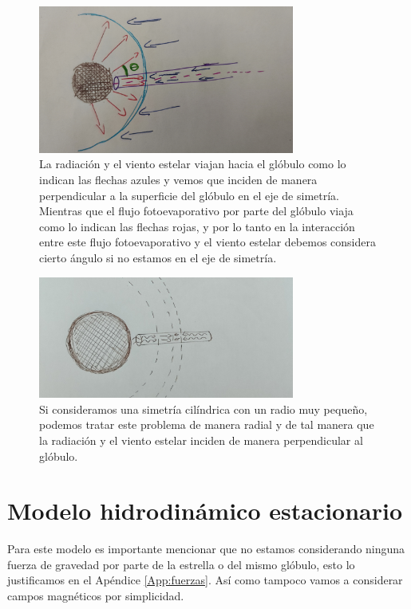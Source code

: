\documentclass{book}
\begin{document}
\begin{figure}[h]
    \centering    \includegraphics[width=0.75\textwidth]{images Chapter 2/C2_angles.jpg}
    \caption{La radiación y el viento estelar viajan hacia el glóbulo como lo indican las flechas azules y vemos que inciden de manera perpendicular a la superficie del glóbulo en el eje de simetría. Mientras que el flujo fotoevaporativo por parte del glóbulo viaja como lo indican las flechas rojas, y por lo tanto en la interacción entre este flujo fotoevaporativo y el viento estelar debemos considera cierto ángulo si no estamos en el eje de simetría.}
    \label{fig:cilindross}
\end{figure}

\begin{figure}[h]
    \centering    \includegraphics[width=0.75\textwidth]{images Chapter 2/Chp2_cilinders.jpg}
    \caption{Si consideramos una simetría cilíndrica con un radio muy pequeño, podemos tratar este problema de manera radial y de tal manera que la radiación y el viento estelar inciden de manera perpendicular al glóbulo.}
    \label{fig:cilinders}
\end{figure}

\section{Modelo hidrodinámico estacionario}

Para este modelo es importante mencionar que no estamos considerando ninguna fuerza de gravedad por parte de la estrella o del mismo glóbulo, esto lo justificamos en el Apéndice \ref{App:fuerzas}. Así como tampoco vamos a considerar campos magnéticos por simplicidad.
\end{document}

